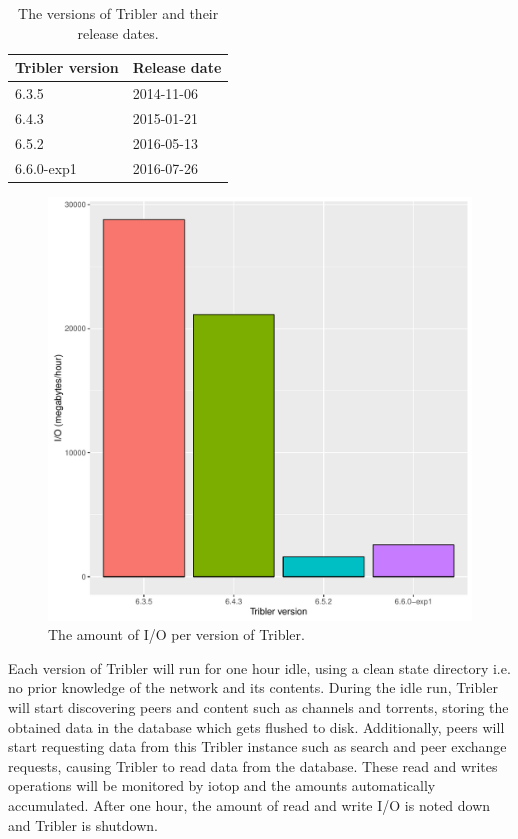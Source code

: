 \begin{table}[h]
	\centering
	\caption{The versions of Tribler and their release dates.}
	\label{table:tribler_version_dates}
	\begin{tabular}{|l|l|}
		\hline
		Tribler version & Release date \\ \hline
		6.3.5           & 2014-11-06   \\ \hline
		6.4.3           & 2015-01-21   \\ \hline
		6.5.2           & 2016-05-13   \\ \hline
		6.6.0-exp1      & 2016-07-26   \\ \hline
	\end{tabular}
\end{table}

\begin{figure}[!h]
	\centering
	\includegraphics[width=\linewidth]{experimentation/images/io_history}
	\caption{The amount of I/O per version of Tribler.}
	\label{fig:io_history}
\end{figure} 

Each version of Tribler will run for one hour idle, using a clean state directory i.e. no prior knowledge of the network and its contents.
During the idle run, Tribler will start discovering peers and content such as channels and torrents, storing the obtained data in the database which gets flushed to disk.
Additionally, peers will start requesting data from this Tribler instance such as search and peer exchange requests, causing Tribler to read data from the database.
These read and writes operations will be monitored by iotop and the amounts automatically accumulated.
After one hour, the amount of read and write I/O is noted down and Tribler is shutdown.


